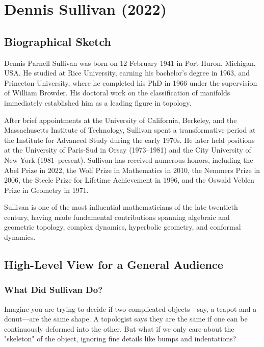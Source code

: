 \chapter{Dennis Sullivan (2022)}

\section{Biographical Sketch}



Dennis Parnell Sullivan was born on 12 February 1941 in Port Huron, Michigan, USA. He studied at Rice University, earning his bachelor's degree in 1963, and Princeton University, where he completed his PhD in 1966 under the supervision of William Browder. His doctoral work on the classification of manifolds immediately established him as a leading figure in topology.

After brief appointments at the University of California, Berkeley, and the Massachusetts Institute of Technology, Sullivan spent a transformative period at the Institute for Advanced Study during the early 1970s. He later held positions at the University of Paris-Sud in Orsay (1973--1981) and the City University of New York (1981--present). Sullivan has received numerous honors, including the Abel Prize in 2022, the Wolf Prize in Mathematics in 2010, the Nemmers Prize in 2006, the Steele Prize for Lifetime Achievement in 1996, and the Oswald Veblen Prize in Geometry in 1971.

Sullivan is one of the most influential mathematicians of the late twentieth century, having made fundamental contributions spanning algebraic and geometric topology, complex dynamics, hyperbolic geometry, and conformal dynamics.

\section{High-Level View for a General Audience}

\subsection{What Did Sullivan Do?}

Imagine you are trying to decide if two complicated objects---say, a teapot and a donut---are the same shape. A topologist says they are the same if one can be continuously deformed into the other. But what if we only care about the "skeleton" of the object, ignoring fine details like bumps and indentations?

